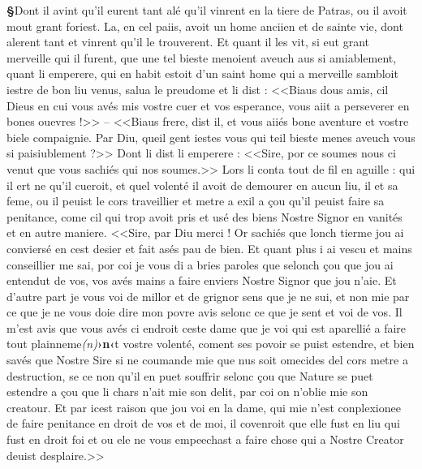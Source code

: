 \documentclass[12pt]{article} %
\newcommand{\colmar}[1]{\marginnote{[#1]}}          %
\newcommand{\corr}[2]{\emph{(#1)}\textbf{›#2‹}} %
\newcommand{\supplied}[1]{\textlangle#1\textrangle} %
\newcounter{paranum}
\newcommand{\pnum}{\stepcounter{paranum}\textbf{§\arabic{paranum}}\quad}
\begin{document}
\pnum Dont il avint qu'il eurent tant alé qu'il vi\supplied{n}rent en la tiere de Patras, ou il avoit mout grant foriest. La, en cel paiis, avoit un home anciien et de sainte vie, dont alerent tant et vinrent qu'il le trouverent. Et quant il les vit, si eut grant merveille qui il fure\supplied{n}t, que une tel bieste menoient aveuch aus si amiablement, quant li emperere, qui en habit estoit d'un saint home qui a merveille sambloit iestre de bon liu venus, salua le preudome et li dist : <<Biaus dous amis, cil Dieus en cui vous avés mis vostre cuer et vos esperance, vous aiit a perseverer en bones ouevres !>> -- <<Biaus frere, dist il, et vous aiiés bone aventure et vostre biele compaignie. Par Diu, queil gent iestes vous qui teil bieste menes aveuch vous si paisiublement ?>> Dont li dist li emperere : <<Sire, por ce soumes nous ci venut que vous sachiés qui nos soumes.>> Lors li conta tout de fil en aguille : qui il ert ne qu'il cueroit, et quel volenté il avoit de demourer en aucun liu, il et sa feme, ou il peuist le cors traveillier et metre a exil a çou qu'il peuist faire sa penitance, come cil qui trop avoit pris et usé des biens Nostre Signor en vanités et en autre maniere. <<Sire, par Diu merci ! Or sachiés que lonch tierme jou ai conviersé en cest desier et fait asés pau de bien. Et quant plus i ai vescu et mains conseillier me sai, por coi je vous di a bries paroles que selonch çou que jou ai entendut de vos, vos avés mains a faire enviers Nostre Signor que jou n'aie. Et d'autre part je vous voi de millor et de grignor sens que je ne sui, et non mie par ce que je ne vous doie dire mon povre avis selonc ce que je sent et voi de vos. Il m'est avis que vous avés ci endroit ceste dame que je voi qui est aparellié a faire tout plainneme\corr{n}{n}t vostre volenté, coment ses povoir se puist estendre, et bien savés que Nostre Sire si ne coumande mie que nus soit omecides del cors metre a destruction, se ce non qu'il en puet souffrir selonc çou que Nature se puet estendre a çou que li chars n'ait mie son delit, par coi on n'oblie mie son creatour. Et par icest raison que jou voi en la dame, qui mie n'est conplexionee de faire penitance en droit de vos et de moi, il covenroit que elle fust en liu qui fust en droit foi et ou ele ne \colmar{9rb}\colmar{b} vous empeechast a faire chose qui a Nostre Creator deuist desplaire.>>
\end{document}
